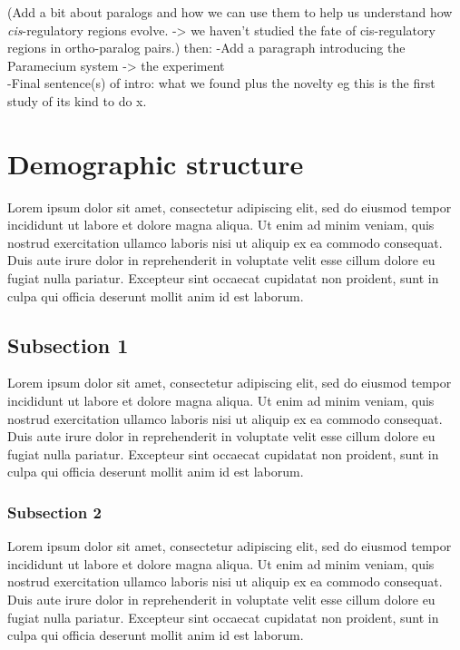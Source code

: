 \documentclass[nogrid]{MBE}%
\begin{document}
(Add a bit about paralogs and how we can use them to help us understand how \textit{cis}-regulatory regions evolve. -> we haven't studied the fate of cis-regulatory regions in ortho-paralog pairs.) then:
-Add a paragraph introducing the Paramecium system -> the experiment\\
-Final sentence(s) of intro: what we found plus the novelty eg this is the first study of its kind to do x.

\section{Demographic structure}

Lorem ipsum dolor sit amet, consectetur adipiscing elit, sed do eiusmod tempor incididunt ut labore et dolore magna aliqua. Ut enim ad minim veniam, quis nostrud exercitation ullamco laboris nisi ut aliquip ex ea commodo consequat. Duis aute irure dolor in reprehenderit in voluptate velit esse cillum dolore eu fugiat nulla pariatur. Excepteur sint occaecat cupidatat non proident, sunt in culpa qui officia deserunt mollit anim id est laborum.

\subsection{Subsection 1}

Lorem ipsum dolor sit amet, consectetur adipiscing elit, sed do eiusmod tempor incididunt ut labore et dolore magna aliqua. Ut enim ad minim veniam, quis nostrud exercitation ullamco laboris nisi ut aliquip ex ea commodo consequat. Duis aute irure dolor in reprehenderit in voluptate velit esse cillum dolore eu fugiat nulla pariatur. Excepteur sint occaecat cupidatat non proident, sunt in culpa qui officia deserunt mollit anim id est laborum.


\subsubsection{Subsection 2}

Lorem ipsum dolor sit amet, consectetur adipiscing elit, sed do eiusmod tempor incididunt ut labore et dolore magna aliqua. Ut enim ad minim veniam, quis nostrud exercitation ullamco laboris nisi ut aliquip ex ea commodo consequat. Duis aute irure dolor in reprehenderit in voluptate velit esse cillum dolore eu fugiat nulla pariatur. Excepteur sint occaecat cupidatat non proident, sunt in culpa qui officia deserunt mollit anim id est laborum.
\end{document}
